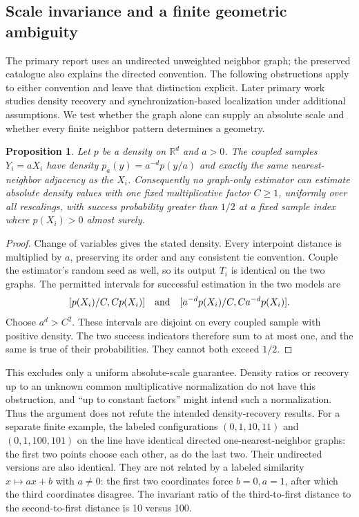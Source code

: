 \documentclass[11pt]{article}
\newtheorem{proposition}{Proposition}
\begin{document}
\subsection{Scale invariance and a finite geometric ambiguity}
The primary report uses an undirected unweighted neighbor graph; the preserved catalogue also explains the directed convention. The following obstructions apply to either convention and leave that distinction explicit. Later primary work studies density recovery and synchronization-based localization under additional assumptions. We test whether the graph alone can supply an absolute scale and whether every finite neighbor pattern determines a geometry.
\begin{proposition}
Let $p$ be a density on $\mathbb R^d$ and $a>0$. The coupled samples $Y_i=aX_i$ have density $p_a(y)=a^{-d}p(y/a)$ and exactly the same nearest-neighbor adjacency as the $X_i$. Consequently no graph-only estimator can estimate absolute density values with one fixed multiplicative factor $C\ge1$, uniformly over all rescalings, with success probability greater than $1/2$ at a fixed sample index where $p(X_i)>0$ almost surely.
\end{proposition}
\begin{proof}
Change of variables gives the stated density. Every interpoint distance is multiplied by $a$, preserving its order and any consistent tie convention. Couple the estimator's random seed as well, so its output $T_i$ is identical on the two graphs. The permitted intervals for successful estimation in the two models are
\[
[p(X_i)/C,Cp(X_i)]\quad\hbox{and}\quad
[a^{-d}p(X_i)/C,Ca^{-d}p(X_i)].
\]
Choose $a^d>C^2$. These intervals are disjoint on every coupled sample with positive density. The two success indicators therefore sum to at most one, and the same is true of their probabilities. They cannot both exceed $1/2$.
\end{proof}
This excludes only a uniform absolute-scale guarantee. Density ratios or recovery up to an unknown common multiplicative normalization do not have this obstruction, and ``up to constant factors'' might intend such a normalization. Thus the argument does not refute the intended density-recovery results.
For a separate finite example, the labeled configurations $(0,1,10,11)$ and $(0,1,100,101)$ on the line have identical directed one-nearest-neighbor graphs: the first two points choose each other, as do the last two. Their undirected versions are also identical. They are not related by a labeled similarity $x\mapsto ax+b$ with $a\ne0$: the first two coordinates force $b=0,a=1$, after which the third coordinates disagree. The invariant ratio of the third-to-first distance to the second-to-first distance is 10 versus 100.
\end{document}
